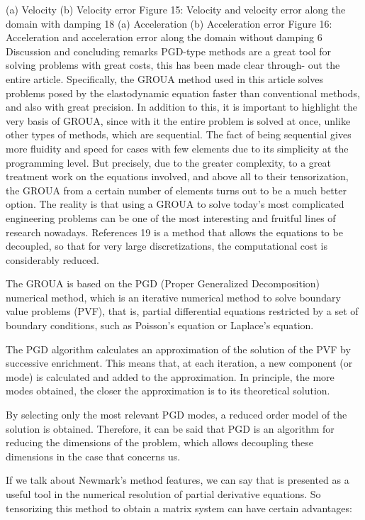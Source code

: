 \documentclass[a4paper, 10pt]{article}
\begin{document}
(a) Velocity (b) Velocity error
Figure 15: Velocity and velocity error along the domain with damping
18
(a) Acceleration (b) Acceleration error
Figure 16: Acceleration and acceleration error along the domain without damping
6 Discussion and concluding remarks
PGD-type methods are a great tool for solving problems with great costs, this has been made clear through-
out the entire article. Specifically, the GROUA method used in this article solves problems posed by the
elastodynamic equation faster than conventional methods, and also with great precision.
In addition to this, it is important to highlight the very basis of GROUA, since with it the entire problem
is solved at once, unlike other types of methods, which are sequential. The fact of being sequential gives
more fluidity and speed for cases with few elements due to its simplicity at the programming level. But
precisely, due to the greater complexity, to a great treatment work on the equations involved, and above
all to their tensorization, the GROUA from a certain number of elements turns out to be a much better option.
The reality is that using a GROUA to solve today’s most complicated engineering problems can be one
of the most interesting and fruitful lines of research nowadays.
References
19
 is a method that allows the equations to be decoupled, so that for very large discretizations, the computational cost is considerably reduced.

The GROUA is based on the PGD (Proper Generalized Decomposition) numerical method, which is an iterative numerical method to solve boundary value problems (PVF), that is, partial differential equations restricted by a set of boundary conditions, such as Poisson's equation or Laplace's equation.

The PGD algorithm calculates an approximation of the solution of the PVF by successive enrichment. This means that, at each iteration, a new component (or mode) is calculated and added to the approximation. In principle, the more modes obtained, the closer the approximation is to its theoretical solution.

By selecting only the most relevant PGD modes, a reduced order model of the solution is obtained. Therefore, it can be said that PGD is an algorithm for reducing the dimensions of the problem, which allows decoupling these dimensions in the case that concerns us.



 If we talk about Newmark's method features, we can say that is presented as a useful tool in the numerical resolution of partial derivative equations. So tensorizing this method to obtain a matrix system can have certain advantages:
\end{document}

